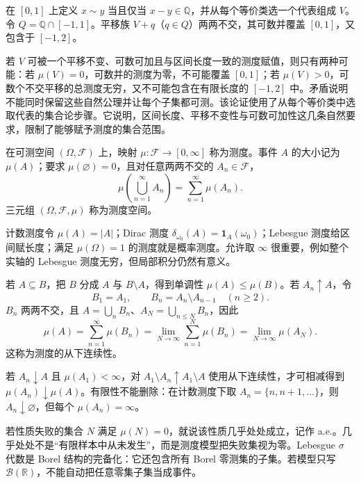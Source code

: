 
在 $[0,1]$ 上定义 $x\sim y$ 当且仅当 $x-y\in\mathbb Q$，并从每个等价类选一个代表组成 $V$。令 $Q=\mathbb Q\cap[-1,1]$。平移族 $V+q$（$q\in Q$）两两不交，其可数并覆盖 $[0,1]$，又包含于 $[-1,2]$。

若 $V$ 可被一个平移不变、可数可加且与区间长度一致的测度赋值，则只有两种可能：若 $\mu(V)=0$，可数并的测度为零，不可能覆盖 $[0,1]$；若 $\mu(V)>0$，可数个不交平移的总测度无穷，又不可能包含在有限长度的 $[-1,2]$ 中。矛盾说明不能同时保留这些自然公理并让每个子集都可测。该论证使用了从每个等价类中选取代表的集合论步骤。它说明，区间长度、平移不变性与可数可加性这几条自然要求，限制了能够赋予测度的集合范围。


\begin{definition}[测度]
在可测空间 $(\Omega,\mathcal F)$ 上，映射 $\mu:\mathcal F\to[0,\infty]$ 称为测度。事件 $A$ 的大小记为 $\mu(A)$；要求 $\mu(\varnothing)=0$，且对任意两两不交的 $A_n\in\mathcal F$，
\[
 \mu\!\left(\bigcup_{n=1}^{\infty}A_n\right)
 =\sum_{n=1}^{\infty}\mu(A_n).
\]
三元组 $(\Omega,\mathcal F,\mu)$ 称为测度空间。
\end{definition}

计数测度令 $\mu(A)=|A|$；Dirac 测度 $\delta_{\omega_0}(A)=\mathbf{1}_{A}(\omega_0)$；Lebesgue 测度给区间赋长度；满足 $\mu(\Omega)=1$ 的测度就是概率测度。允许取 $\infty$ 很重要，例如整个实轴的 Lebesgue 测度无穷，但局部积分仍然有意义。


若 $A\subseteq B$，把 $B$ 分成 $A$ 与 $B\setminus A$，得到单调性 $\mu(A)\leq\mu(B)$。若 $A_n\uparrow A$，令
\[
 B_1=A_1,\qquad B_n=A_n\setminus A_{n-1}\quad(n\geq2).
\]
$B_n$ 两两不交，且 $A=\bigcup_nB_n$、$A_N=\bigcup_{n\leq N}B_n$，因此
\[
 \mu(A)=\sum_{n=1}^{\infty}\mu(B_n)
 =\lim_{N\to\infty}\sum_{n=1}^{N}\mu(B_n)
 =\lim_{N\to\infty}\mu(A_N).
\]
这称为测度的从下连续性。

若 $A_n\downarrow A$ 且 $\mu(A_1)<\infty$，对 $A_1\setminus A_n\uparrow A_1\setminus A$ 使用从下连续性，才可相减得到 $\mu(A_n)\downarrow\mu(A)$。有限性不能删除：在计数测度下取 $A_n=\{n,n+1,\ldots\}$，则 $A_n\downarrow\varnothing$，但每个 $\mu(A_n)=\infty$。


若性质失败的集合 $N$ 满足 $\mu(N)=0$，就说该性质几乎处处成立，记作 a.e.。几乎处处不是“有限样本中从未发生”，而是测度模型把失败集视为零。Lebesgue $\sigma$ 代数是 Borel 结构的完备化：它还包含所有 Borel 零测集的子集。若模型只写 $\mathcal B(\mathbb R)$，不能自动把任意零集子集当成事件。

